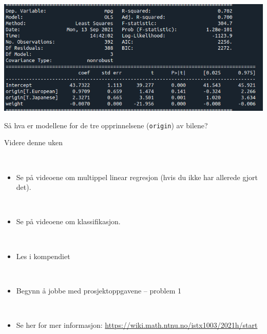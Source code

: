 \documentclass[10pt,ignorenonframetext,]{beamer}
\providecommand{\tightlist}{%
  \setlength{\itemsep}{0pt}\setlength{\parskip}{0pt}}
\begin{document}
\begin{frame}[fragile]

\includegraphics{kategorisk_variabel.png}

\vspace{2mm}

Så hva er modellene for de tre opprinnelsene (\texttt{origin}) av
bilene?

\end{frame}

\begin{frame}{Videre denne uken}
\protect\hypertarget{videre-denne-uken}{}

\(~\)

\begin{itemize}
\tightlist
\item
  Se på videoene om multippel linear regresjon (hvis du ikke har
  allerede gjort det).
\end{itemize}

\(~\)

\begin{itemize}
\tightlist
\item
  Se på videoene om klassifikasjon.
\end{itemize}

\(~\)

\begin{itemize}
\tightlist
\item
  Les i kompendiet
\end{itemize}

\(~\)

\begin{itemize}
\tightlist
\item
  Begynn å jobbe med prosjektoppgavene -- problem 1
\end{itemize}

\(~\)

\begin{itemize}
\tightlist
\item
  Se her for mer informasjon:
  \url{https://wiki.math.ntnu.no/istx1003/2021h/start}
\end{itemize}

\end{frame}
\end{document}
